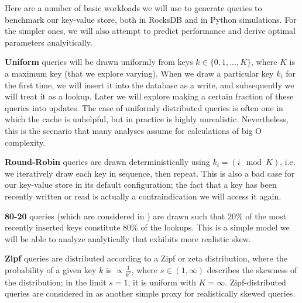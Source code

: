 \documentclass{sig-alternate-05-2015}
\begin{document}
Here are a number of basic workloads we will use to generate queries to
benchmark our key-value store, both in RocksDB and in Python simulations. For
the simpler ones, we will also attempt to predict performance and derive
optimal parameters analyitically.

\textbf{Uniform} queries will be drawn uniformly from keys $k \in
\{0,1,...,K\}$, where $K$ is a maximum key (that we explore varying). When we
draw a particular key $k_i$ for the first time, we will insert it into the
database as a write, and subsequently we will treat it as a lookup. Later we
will explore making a certain fraction of these queries into updates. The case
of uniformly distributed queries is often one in which the cache is unhelpful,
but in practice is highly unrealistic. Nevertheless, this is the scenario that
many analyses assume for calculations of big O complexity.

\textbf{Round-Robin} queries are drawn deterministically using $k_i = (i \mod
K)$, i.e. we iteratively draw each key in sequence, then repeat. This is also a
bad case for our key-value store in its default configuration; the fact that a
key has been recently written or read is actually a contraindication we will
access it again.

\textbf{80-20} queries (which are considered in \cite{monkey}) are drawn such
that 20\% of the most recently inserted keys constitute 80\% of the lookups.
This is a simple model we will be able to analyze analytically that exhibits
more realistic skew.

\textbf{Zipf} queries are distributed according to a Zipf or zeta distribution,
where the probability of a given key $k$ is $\propto \frac{1}{k^s}$, where $s
\in (1, \infty)$ describes the skewness of the distribution; in the limit
$s=1$, it is uniform with $K=\infty$. Zipf-distributed queries are considered
in \cite{art} as another simple proxy for realistically skewed queries.
\end{document}
